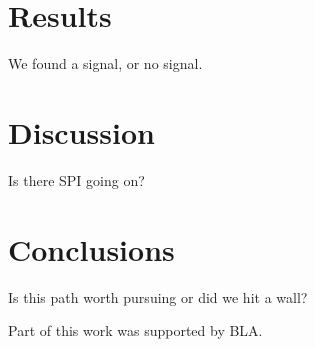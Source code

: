 \documentclass[referee]{aa} %
\begin{document}
\section{Results}
We found a signal, or no signal.

\section{Discussion}
Is there SPI going on?

\section{Conclusions}
Is  this path worth pursuing or did we hit a wall?



\begin{acknowledgements}
      Part of this work was supported by BLA.
\end{acknowledgements}

\end{document}
